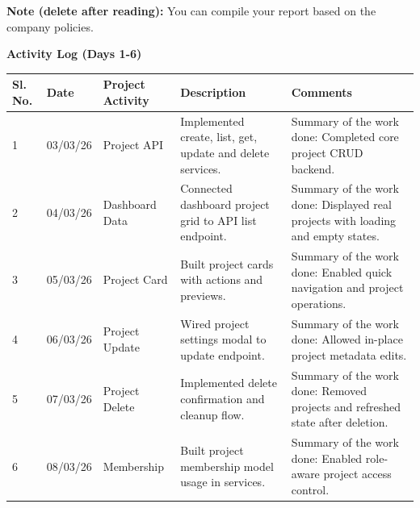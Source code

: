 \documentclass[12pt,a4paper]{article}
\begin{document}
{\color{red}\small\textbf{Note (delete after reading):} You can compile your report based on the company policies.}
\vspace{0.25cm}
\begin{center}{\large\bfseries Activity Log (Days 1-6)}\end{center}
\begin{tabular}{|p{}|p{}|p{}|p{}|p{}|}\hline
\centering\textbf{Sl. No.} & \centering\textbf{Date} & \centering\textbf{Project Activity} & \centering\textbf{Description} & \centering\textbf{Comments} \tabularnewline\hline
1 & 03/03/26 & Project API & Implemented create, list, get, update and delete services. &
Summary of the work done:\newline
Completed core project CRUD backend. \\ \hline
2 & 04/03/26 & Dashboard Data & Connected dashboard project grid to API list endpoint. &
Summary of the work done:\newline
Displayed real projects with loading and empty states. \\ \hline
3 & 05/03/26 & Project Card & Built project cards with actions and previews. &
Summary of the work done:\newline
Enabled quick navigation and project operations. \\ \hline
4 & 06/03/26 & Project Update & Wired project settings modal to update endpoint. &
Summary of the work done:\newline
Allowed in-place project metadata edits. \\ \hline
5 & 07/03/26 & Project Delete & Implemented delete confirmation and cleanup flow. &
Summary of the work done:\newline
Removed projects and refreshed state after deletion. \\ \hline
6 & 08/03/26 & Membership & Built project membership model usage in services. &
Summary of the work done:\newline
Enabled role-aware project access control. \\ \hline
\end{tabular}

\newpage
\end{document}
